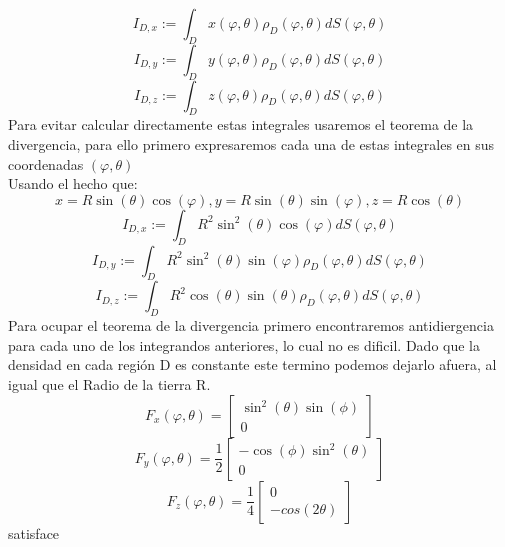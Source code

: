\documentclass[20pt]{report}
\begin{document}
\begin{itemize}
\begin{equation}\label{I1}
I_{D,x} := \int_D x(\varphi, \theta) \rho_D(\varphi,\theta) dS(\varphi, \theta) 
\end{equation}
\begin{equation}\label{I1}
I_{D,y} := \int_D y(\varphi, \theta) \rho_D(\varphi,\theta) dS(\varphi, \theta) 
\end{equation}
\begin{equation}\label{I1}
I_{D,z} := \int_D z(\varphi, \theta) \rho_D(\varphi,\theta) dS(\varphi, \theta) 
\end{equation}
Para evitar calcular directamente estas integrales usaremos el teorema de la divergencia, para ello primero expresaremos cada una de estas integrales en  sus coordenadas $(\varphi, \theta)$
\\
Usando el hecho que:
\[x=R\sin(\theta)\cos(\varphi),y=R\sin(\theta)\sin(\varphi),z=R\cos(\theta) \]
\begin{equation}\label{I1}
I_{D,x} := \int_D  R^2\sin^2(\theta)\cos(\varphi) dS(\varphi, \theta) 
\end{equation}
\begin{equation}\label{I1}
I_{D,y} := \int_D R^2\sin^2(\theta)\sin(\varphi) \rho_D(\varphi,\theta) dS(\varphi, \theta) 
\end{equation}
\begin{equation}\label{I1}
I_{D,z} := \int_D R^2\cos(\theta)\sin(\theta) \rho_D(\varphi,\theta) dS(\varphi, \theta) 
\end{equation}
Para ocupar el teorema de la divergencia primero encontraremos antidiergencia para cada uno de los integrandos anteriores, lo cual no es dificil. Dado que la densidad en cada regi\'on D es constante este termino podemos dejarlo afuera, al igual que el Radio de la tierra R.
\begin{equation}\label{F}
F_x(\varphi, \theta) = \begin{bmatrix}
\sin^2(\theta)\sin(\phi)\\[2ex]
0
\end{bmatrix}
\end{equation}
%
\begin{equation}\label{F}
F_y(\varphi, \theta) = \frac{1}{2}\begin{bmatrix}
-\cos(\phi)\sin^2(\theta) \\[2ex]
0
\end{bmatrix}
\end{equation}
\begin{equation}\label{F}
F_z(\varphi, \theta) = \frac{1}{4}\begin{bmatrix}
0\\[2ex]
-cos(2\theta)
\end{bmatrix}
\end{equation}
satisface



\end{itemize}
\end{document}
